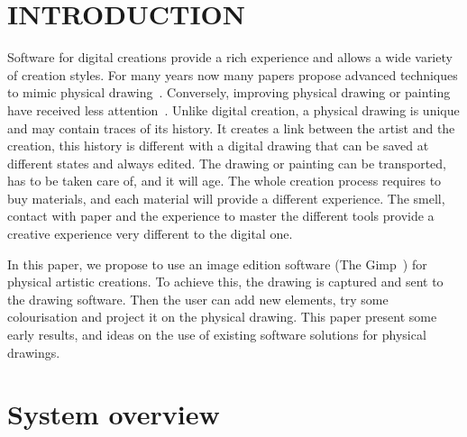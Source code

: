 \documentclass{article}
\begin{document}




\section{INTRODUCTION}

Software for digital creations provide a rich experience and allows a wide variety of creation styles. For many years now many papers propose advanced techniques to mimic physical drawing~\cite{VBGS08}. Conversely, improving physical drawing or painting have received less attention~\cite{flagg2006projector}. Unlike digital creation, a physical drawing is unique and may contain traces of its history.
It creates a link between the artist and the creation, this history is different with a digital drawing that can be saved at different states and always edited.
The drawing or painting can be transported, has to be taken care of, and it will age. The whole creation process requires to buy materials, and each material will provide a different experience. The smell, contact with paper and the experience to master the different tools provide a creative experience very different to the digital one. 

In this paper, we propose to use an image edition software (The Gimp~\cite{gimp2004image}) for physical artistic creations. To achieve this, the drawing is captured and sent to the drawing software. Then the user can add new elements, try some colourisation and project it on the physical drawing. This paper present some early results, and ideas on the use of existing software solutions  for physical drawings.


\section{System overview}

\end{document}
